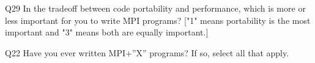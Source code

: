 \begin{description}%
\item{Q29} In the tradeoff between code portability and performance, which is more or less important for you to write MPI programs? ["1" means portability is the most important and "3" means both are equally important.]%
\item{Q22} Have you ever written MPI+”X” programs? If so, select all that apply.%
\end{description}%
